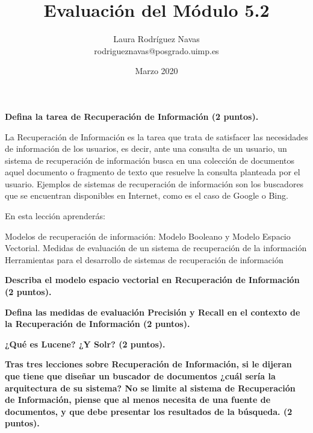 \documentclass[11pt]{exam}
\title{Evaluación del Módulo 5.2}
\author{Laura Rodríguez Navas \\ rodrigueznavas@posgrado.uimp.es}
\date{Marzo 2020}
\begin{document}
	
\maketitle

\begin{questions}

{\bf \question Defina la tarea de Recuperación de Información (2 puntos).}

La Recuperación de Información es la tarea que trata de satisfacer las necesidades de información de los usuarios, es decir, ante una consulta de un usuario, un sistema de recuperación de información busca en una colección de documentos aquel documento o fragmento de texto que resuelve la consulta planteada por el usuario. Ejemplos de sistemas de recuperación de información son los buscadores que se encuentran disponibles en Internet, como es el caso de Google o Bing.

En esta lección aprenderás:

Modelos de recuperación de información: Modelo Booleano y Modelo Espacio Vectorial.
Medidas de evaluación de un sistema de recuperación de la información
Herramientas para el desarrollo de sistemas de recuperación de información


{\bf \question Describa el modelo espacio vectorial en Recuperación de Información (2 puntos).}

{\bf \question Defina las medidas de evaluación Precisión y Recall en el contexto de la Recuperación de Información (2 puntos).}

{\bf \question ¿Qué es Lucene? ¿Y Solr? (2 puntos).}

{\bf \question Tras tres lecciones sobre Recuperación de Información, si le dijeran que tiene que diseñar un buscador de documentos ¿cuál sería la arquitectura de su sistema? No se limite al sistema de Recuperación de Información, piense que al menos necesita de una fuente de documentos, y que debe presentar los resultados de la búsqueda. (2 puntos).}

\end{questions}
	
\end{document}
